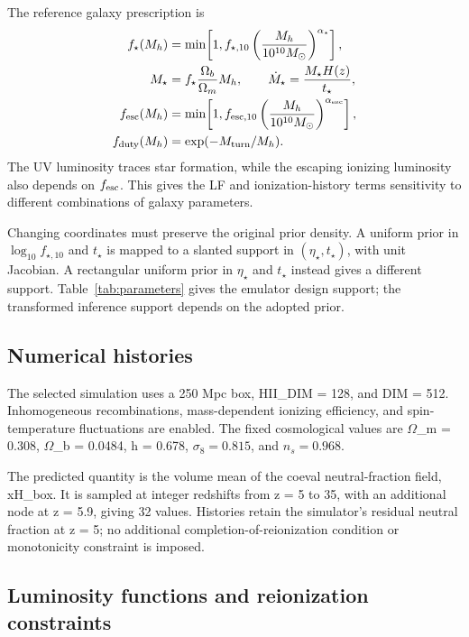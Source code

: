 The reference galaxy prescription \cite{Park2019} is
\begin{align}
f_\star(M_h)&=\min\!\left[1,f_{\star,10}\left(\frac{M_h}{10^{10}M_\odot}\right)^{\alpha_\star}\right],\\
M_\star&=f_\star\frac{\Omega_b}{\Omega_m}M_h,\qquad
\dot M_\star=\frac{M_\star H(z)}{t_\star},\\
f_{\rm esc}(M_h)&=\min\!\left[1,f_{{\rm esc},10}\left(\frac{M_h}{10^{10}M_\odot}\right)^{\alpha_{\rm esc}}\right],\\
f_{\rm duty}(M_h)&=\exp(-M_{\rm turn}/M_h).
\end{align}
The UV luminosity traces star formation, while the escaping ionizing luminosity also depends on $f_{\rm esc}$. This gives the LF and ionization-history terms sensitivity to different combinations of galaxy parameters.

Changing coordinates must preserve the original prior density. A uniform prior in $\log_{10} f_{\star,10}$ and $t_\star$ is mapped to a slanted support in $(\eta_\star,t_\star)$, with unit Jacobian. A rectangular uniform prior in $\eta_\star$ and $t_\star$ instead gives a different support. Table~\ref{tab:parameters} gives the emulator design support; the transformed inference support depends on the adopted prior.

\subsection{Numerical histories}\label{numerical-histories}

The selected simulation uses a 250 Mpc box, HII\_DIM = 128, and DIM = 512. Inhomogeneous recombinations, mass-dependent ionizing efficiency, and spin-temperature fluctuations are enabled. The fixed cosmological values are \(\Omega\)\_m = 0.308, \(\Omega\)\_b = 0.0484, h = 0.678, $\sigma_8=0.815$, and $n_s=0.968$.

The predicted quantity is the volume mean of the coeval neutral-fraction field, xH\_box. It is sampled at integer redshifts from z = 5 to 35, with an additional node at z = 5.9, giving 32 values. Histories retain the simulator's residual neutral fraction at z = 5; no additional completion-of-reionization condition or monotonicity constraint is imposed.

\subsection{Luminosity functions and reionization constraints}\label{luminosity-functions-and-reionization-constraints}\label{observational-data-and-inference}

